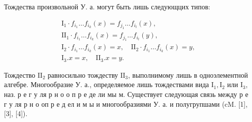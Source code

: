 \documentclass[10pt]{article}
\begin{document}
Тождества произвольной У. а. могут быть лишь следующцих типов:



\[

\begin{gathered}

\mathrm{I}_{1} \cdot f_{i_{1}} \ldots f_{i_{k}}(x)=f_{j_{1}} \ldots f_{i_{l}}(x), \\

\mathrm{II}_{1} \cdot f_{i_{1}} \ldots f_{i_{k}}(x)=f_{j_{1}} \ldots f_{i_{l}}(y), \\

\mathrm{I}_{2} \cdot f_{i_{1}} \ldots f_{i_{k}}(x)=x, \quad \mathrm{II}_{2} \cdot f_{i_{1}} \ldots f_{i_{k}}(x)=y, \\

\mathrm{I}_{3} . x=x, \quad \mathrm{II}_{3} . x=y .

\end{gathered}

\]



Тождество $\mathrm{II}_{2}$ равносильно тождеству $\mathrm{II}_{3}$, выполнимому лишь в одноэлементной алгебре. Многообразие У. а., определяемое лишь тождествами вида $\mathrm{I}_{1}, \mathrm{I}_{2}$ или $\mathrm{I}_{3}$, наз. р е г у ля р н о о п р е де ли мы м. Существует следующая связь между р е г у ля р н о оп р е д ел и м ы и многообразиями У. а. и полугрупшами (cM. [1], [3], [4]).
\end{document}
